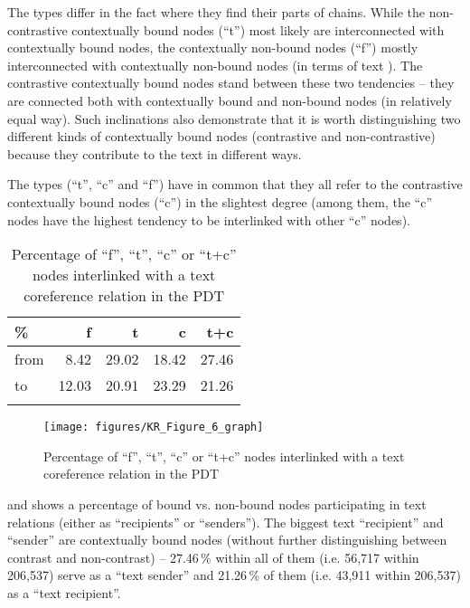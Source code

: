 \documentclass[output=paper]{langsci/langscibook.cls}
\begin{document}
The  types differ in the fact where they find their parts of  chains. While the non-contrastive contextually bound nodes (``t'') most likely are interconnected with contextually bound nodes, the contextually non-bound nodes (``f'') mostly interconnected with contextually non-bound nodes (in terms of text ). The contrastive contextually bound nodes stand between these two tendencies -- they are connected both with contextually bound and non-bound nodes (in relatively equal way). Such inclinations also demonstrate that it is worth distinguishing two different kinds of contextually bound nodes (contrastive and non-contrastive) because they contribute to the text  in different ways.




The  types (``t'', ``c'' and ``f'') have in common that they all refer to the contrastive contextually bound nodes (``c'') in the slightest degree (among them, the ``c'' nodes have the highest tendency to be interlinked with other ``c'' nodes).



\begin{table}
\caption{Percentage of ``f'', ``t'', ``c'' or ``t+c'' nodes interlinked with a text coreference relation in the PDT}
\begin{tabularx}{.8\textwidth}{Xrrrr}
\lsptoprule
\% &
f &
t &
c &
t+c\\
\midrule
from &
8.42 &
29.02 &
18.42 &
27.46\\
to &
12.03 &
20.91 &
23.29 &
21.26\\
\lspbottomrule
\end{tabularx}
\label{rysova_k:tab:4}
\end{table}


\begin{figure} 
\texttt{[image: figures/KR\_Figure\_6\_graph]}
\caption{Percentage of ``f'', ``t'', ``c'' or ``t+c'' nodes interlinked with a text coreference relation in the PDT}
\label{rysova_k:fig:6}
\end{figure}


 and  shows a percentage of bound vs. non-bound nodes participating in text  relations (either as ``recipients'' or ``senders''). The biggest text  ``recipient'' and ``sender'' are contextually bound nodes (without further distinguishing between contrast and non-contrast) -- 27.46\,\% within all of them (i.e. 56,717 within 206,537) serve as a ``text  sender'' and 21.26\,\% of them (i.e. 43,911 within 206,537) as a ``text  recipient''.
\end{document}
